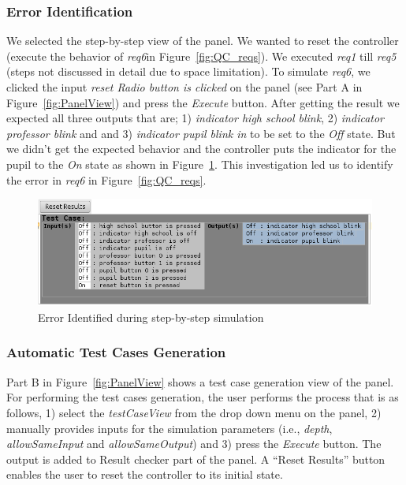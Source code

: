 \subsubsection{Error Identification}
We selected the step-by-step view of the panel. We wanted to reset the
controller (execute the behavior of \emph{req6}in Figure~\ref{fig:QC_reqs}).
We executed \emph{req1} till \emph{req5} (steps not discussed in detail due to
space limitation). To simulate \emph{req6}, we clicked the input
\textsf{\emph{reset Radio button is clicked}} on the panel (see \textsf{Part A}
in Figure~\ref{fig:PanelView}) and press the \emph{Execute} button. After
getting the result we expected all three outputs that are; 1) \emph{
indicator high school blink}, 2) \emph{indicator professor blink} and and 3)
\emph{indicator pupil blink in} to be set to the \emph{Off} state. But we
didn't get the expected behavior and the controller puts the indicator for the
pupil to the \emph{On} state as shown in Figure~\ref{fig:simError}. This
investigation led us to identify the error in \emph{req6} in
Figure~\ref{fig:QC_reqs}.
\begin{figure}[!h]
\centering
\includegraphics[width=.9\textwidth]{./images/Simulation_Error.png}
\caption{Error Identified during step-by-step simulation}
\label{fig:simError}
\end{figure}
\subsubsection{Automatic Test Cases Generation} 
\vspace{-.5cm}
\textsf{Part B} in Figure~\ref{fig:PanelView} shows a
test case generation view of the panel. For performing the test cases
generation, the user performs the process that is as follows, 1) select the
\textsf{\emph{testCaseView}} from the drop down menu on the panel, 2)
manually provides inputs for the simulation parameters (i.e., \emph{depth},
\emph{allowSameInput} and \emph{allowSameOutput}) and 3) press the
\emph{Execute} button.
The output is added to \textsf{Result checker} part of the panel. A \textsf{“Reset Results”} button enables the user to reset the controller to its initial state.
